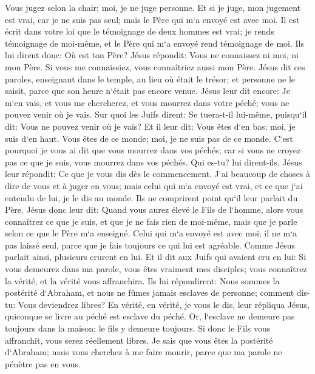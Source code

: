 \verse Vous jugez selon la chair; moi, je ne juge personne. 
\verse Et si je juge, mon jugement est vrai, car je ne suis pas seul; mais le Père qui m`a envoyé est avec moi. 
\verse Il est écrit dans votre loi que le témoignage de deux hommes est vrai; 
\verse je rends témoignage de moi-même, et le Père qui m`a envoyé rend témoignage de moi. 
\verse Ils lui dirent donc: Où est ton Père? Jésus répondit: Vous ne connaissez ni moi, ni mon Père. Si vous me connaissiez, vous connaîtriez aussi mon Père. 
\verse Jésus dit ces paroles, enseignant dans le temple, au lieu où était le trésor; et personne ne le saisit, parce que son heure n`était pas encore venue. 
\verse Jésus leur dit encore: Je m`en vais, et vous me chercherez, et vous mourrez dans votre péché; vous ne pouvez venir où je vais. 
\verse Sur quoi les Juifs dirent: Se tuera-t-il lui-même, puisqu`il dit: Vous ne pouvez venir où je vais? 
\verse Et il leur dit: Vous êtes d`en bas; moi, je suis d`en haut. Vous êtes de ce monde; moi, je ne suis pas de ce monde. 
\verse C`est pourquoi je vous ai dit que vous mourrez dans vos péchés; car si vous ne croyez pas ce que je suis, vous mourrez dans vos péchés. 
\verse Qui es-tu? lui dirent-ils. Jésus leur répondit: Ce que je vous dis dès le commencement. 
\verse J`ai beaucoup de choses à dire de vous et à juger en vous; mais celui qui m`a envoyé est vrai, et ce que j`ai entendu de lui, je le dis au monde. 
\verse Ils ne comprirent point qu`il leur parlait du Père. 
\verse Jésus donc leur dit: Quand vous aurez élevé le Fils de l`homme, alors vous connaîtrez ce que je suis, et que je ne fais rien de moi-même, mais que je parle selon ce que le Père m`a enseigné. 
\verse Celui qui m`a envoyé est avec moi; il ne m`a pas laissé seul, parce que je fais toujours ce qui lui est agréable. 
\verse Comme Jésus parlait ainsi, plusieurs crurent en lui. 
\verse Et il dit aux Juifs qui avaient cru en lui: Si vous demeurez dans ma parole, vous êtes vraiment mes disciples; 
\verse vous connaîtrez la vérité, et la vérité vous affranchira. 
\verse Ils lui répondirent: Nous sommes la postérité d`Abraham, et nous ne fûmes jamais esclaves de personne; comment dis-tu: Vous deviendrez libres? 
\verse En vérité, en vérité, je vous le dis, leur répliqua Jésus, quiconque se livre au péché est esclave du péché. 
\verse Or, l`esclave ne demeure pas toujours dans la maison; le fils y demeure toujours. 
\verse Si donc le Fils vous affranchit, vous serez réellement libres. 
\verse Je sais que vous êtes la postérité d`Abraham; mais vous cherchez à me faire mourir, parce que ma parole ne pénètre pas en vous. 
